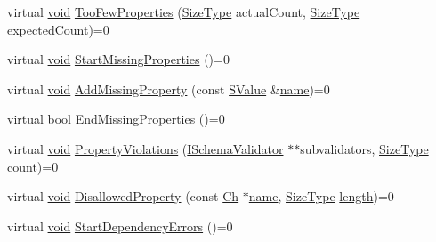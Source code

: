 \begin{DoxyCompactItemize}
virtual \hyperlink{imgui__impl__opengl3__loader_8h_ac668e7cffd9e2e9cfee428b9b2f34fa7}{void} \hyperlink{classinternal_1_1IValidationErrorHandler_adf515d2fad2e55bc0735a6fb16eec9e6}{Too\+Few\+Properties} (\hyperlink{rapidjson_8h_a5ed6e6e67250fadbd041127e6386dcb5}{Size\+Type} actual\+Count, \hyperlink{rapidjson_8h_a5ed6e6e67250fadbd041127e6386dcb5}{Size\+Type} expected\+Count)=0
\item 
virtual \hyperlink{imgui__impl__opengl3__loader_8h_ac668e7cffd9e2e9cfee428b9b2f34fa7}{void} \hyperlink{classinternal_1_1IValidationErrorHandler_ac0073bef86b572b4517876b304aada0f}{Start\+Missing\+Properties} ()=0
\item 
virtual \hyperlink{imgui__impl__opengl3__loader_8h_ac668e7cffd9e2e9cfee428b9b2f34fa7}{void} \hyperlink{classinternal_1_1IValidationErrorHandler_a3a2165f53ab565e052bcd35b6d19e473}{Add\+Missing\+Property} (const \hyperlink{classinternal_1_1IValidationErrorHandler_a22eda6c4ea9537f1ba00d76af052649a}{S\+Value} \&\hyperlink{imgui__impl__opengl3__loader_8h_a5c4947d4516dd7cfa3505ce3a648a4ef}{name})=0
\item 
virtual bool \hyperlink{classinternal_1_1IValidationErrorHandler_a3a01eec1a969cfb600340a2bad157c9c}{End\+Missing\+Properties} ()=0
\item 
virtual \hyperlink{imgui__impl__opengl3__loader_8h_ac668e7cffd9e2e9cfee428b9b2f34fa7}{void} \hyperlink{classinternal_1_1IValidationErrorHandler_abd92773fa046eeb6fd8416468e62e5b1}{Property\+Violations} (\hyperlink{classinternal_1_1ISchemaValidator}{I\+Schema\+Validator} $\ast$$\ast$subvalidators, \hyperlink{rapidjson_8h_a5ed6e6e67250fadbd041127e6386dcb5}{Size\+Type} \hyperlink{imgui__impl__opengl3__loader_8h_a619bc20e8198de3bd3f3d7fc34de66b2}{count})=0
\item 
virtual \hyperlink{imgui__impl__opengl3__loader_8h_ac668e7cffd9e2e9cfee428b9b2f34fa7}{void} \hyperlink{classinternal_1_1IValidationErrorHandler_a689b8acc4cbe3e8683c1a29950438ac8}{Disallowed\+Property} (const \hyperlink{classinternal_1_1IValidationErrorHandler_a22e6a5f35edb9b614156ad606dcc79d7}{Ch} $\ast$\hyperlink{imgui__impl__opengl3__loader_8h_a5c4947d4516dd7cfa3505ce3a648a4ef}{name}, \hyperlink{rapidjson_8h_a5ed6e6e67250fadbd041127e6386dcb5}{Size\+Type} \hyperlink{imgui__impl__opengl3__loader_8h_a011fc24f10426c01349e94a4edd4b0d5}{length})=0
\item 
virtual \hyperlink{imgui__impl__opengl3__loader_8h_ac668e7cffd9e2e9cfee428b9b2f34fa7}{void} \hyperlink{classinternal_1_1IValidationErrorHandler_ab3cf4b9fe450ff76f52d70a2888f0342}{Start\+Dependency\+Errors} ()=0
$$
\end{DoxyCompactItemize}
